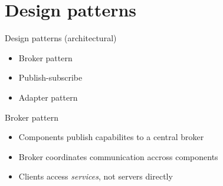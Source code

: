 \documentclass[10pt]{beamer}
\begin{document}
\section{Design patterns}

\begin{frame}{Design patterns (architectural)}
  \begin{itemize}
    \item Broker pattern
    \item Publish-subscribe
    \item Adapter pattern
  \end{itemize}
\end{frame}

\begin{frame}{Broker pattern}
  \begin{itemize}
    \item Components publish capabilites to a central broker
    \item Broker coordinates communication accross components
    \item Clients access \textit{services}, not servers directly
  \end{itemize}
\end{frame}

\end{document}
